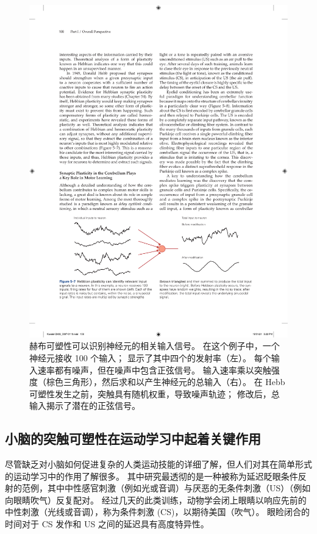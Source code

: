 \begin{figure}[htbp]
	\centering
	\includegraphics[width=1.0\linewidth]{chap05/fig_5_7}
	\caption{赫布可塑性可以识别神经元的相关输入信号。
		在这个例子中，一个神经元接收 100 个输入； 显示了其中四个的发射率（左）。 
		每个输入速率都有噪声，但在噪声中包含正弦信号。 
		输入速率乘以突触强度（棕色三角形），然后求和以产生神经元的总输入（右）。 
		在 Hebb 可塑性发生之前，突触具有随机权重，导致噪声轨迹； 修改后，总输入揭示了潜在的正弦信号。}
	\label{fig:5_7}
\end{figure}


\subsection{小脑的突触可塑性在运动学习中起着关键作用}
尽管缺乏对小脑如何促进复杂的人类运动技能的详细了解，但人们对其在简单形式的运动学习中的作用了解很多。 
其中研究最透彻的是一种被称为延迟眨眼条件反射的范例，其中中性感官刺激（例如光或音调）与厌恶的无条件刺激（US）（例如向眼睛吹气）反复配对。 
经过几天的此类训练，动物学会闭上眼睛以响应先前的中性刺激（光线或音调），称为条件刺激 (CS)，以期待美国（吹气）。 
眼睑闭合的时间对于 CS 发作和 US 之间的延迟具有高度特异性。


